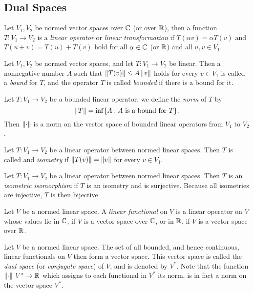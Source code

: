 \documentclass[12pt]{article}
\begin{document}
\subsection{Dual Spaces}
\begin{definition}
    Let $V_1,V_2$ be normed vector spaces over $\mathbb{C}$ (or over $\mathbb{R}$), then a function $T:V_1\to V_2$ is a \textit{linear operator} or \textit{linear transformation} if $T(\alpha v)=\alpha T(v)$ and $T(u+v)=T(u)+T(v)$ hold for all $\alpha\in\mathbb{C}$ (or $\mathbb{R}$) and all $u,v\in V_1$.
\end{definition}
\begin{definition}
    Let $V_1,V_2$ be normed vector spaces, and let $T:V_1 \to V_2$ be linear. Then a nonnegative number $A$ such that $\left\lVert T(v)\right\rVert\leq A\left\lVert v\right\rVert$ holds for every $v\in V_1$ is called a \textit{bound} for $T$, and the operator $T$ is called \textit{bounded} if there is a bound for it.
\end{definition}
\begin{definition}
    Let $T:V_1\to V_2$ be a bounded linear operator, we define the \textit{norm} of $T$ by
    \begin{equation*}
        \left\lVert T\right\rVert=\inf\{A: A\text{ is a bound for }T\}.
    \end{equation*}
    Then $\left\lVert\cdot\right\rVert$ is a norm on the vector space of bounded linear operators from $V_1$ to $V_2$.
\end{definition}
\begin{definition}[Isometry]
    Let $T:V_1\to V_2$ be a linear operator between normed linear spaces. Then $T$ is called and \textit{isometry} if $\left\lVert T(v)\right\rVert=\left\lVert v\right\rVert$ for every $v\in V_1$.
\end{definition}
\begin{definition}
    Let $T:V_1\to V_2$ be a linear operator between normed linear spaces. Then $T$ is an \textit{isometric isomorphism} if $T$ is an isometry and is surjective. Because all isometries are injective, $T$ is then bijective.
\end{definition}
\begin{definition}
    Let $V$ be a normed linear space. A \textit{linear functional} on $V$ is a linear operator on $V$ whose values lie in $\mathbb{C}$, if $V$ is a vector space over $\mathbb{C}$, or in $\mathbb{R}$, if $V$ is a vector space over $\mathbb{R}$.
\end{definition}
\begin{definition}
    Let $V$ be a normed linear space. The set of all bounded, and hence continuous, linear functionals on $V$ then form a vector space. This vector space is called the \textit{dual space} (or \textit{conjugate space}) of $V$, and is denoted by $V^*$. Note that the function $\left\lVert\cdot\right\rVert\:V^*\to \mathbb{R}$ which assigns to each functional in $V^*$ its norm, is in fact a norm on the vector space $V^*$.
\end{definition}
\newpage
\end{document}
